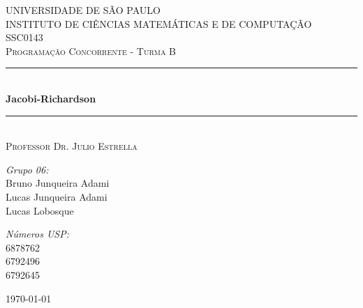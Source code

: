 \documentclass[a4paper]{article}
\newcommand{\HRule}{\rule{\linewidth}{0.5mm}}
\begin{document}
\begin{titlepage}
\begin{center}	

\textsc{\Large UNIVERSIDADE DE SÃO PAULO\\
	INSTITUTO DE CIÊNCIAS MATEMÁTICAS E DE COMPUTAÇÃO}\\[0.7cm]

\textsc{\Large SSC0143}\\[0.2cm]
\textsc{\Large Programação Concorrente - Turma B}\\[0.5cm]

\HRule \\[0.4cm]
{ \huge \bfseries Jacobi-Richardson}\\[0.4cm]
\HRule \\[0.4cm]
\textsc{Professor Dr. Julio Estrella}\\[1.5cm]

\begin{minipage}{0.4\textwidth}
\begin{flushleft} \large
\emph{Grupo 06:}\\
Bruno Junqueira Adami\\
Lucas Junqueira Adami\\
Lucas Lobosque\\
\end{flushleft}
\end{minipage}
\begin{minipage}{0.4\textwidth}
\begin{flushright} \large
\emph{Números USP:}\\
6878762\\
6792496\\
6792645\\
\end{flushright}
\end{minipage}

\vfill

{\large \today}
	
\end{center}
\end{titlepage}
\end{document}
